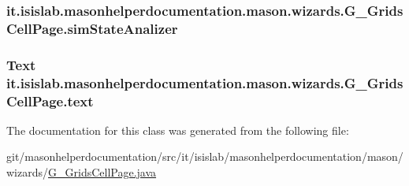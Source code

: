 \hypertarget{classit_1_1isislab_1_1masonhelperdocumentation_1_1mason_1_1wizards_1_1_g___grids_cell_page_aadd93c2041dd8e74fd87a3a432504fa2}{
\subsubsection[{sim\-State\-Analizer}]{ it.\-isislab.\-masonhelperdocumentation.\-mason.\-wizards.\-G\-\_\-\-Grids\-Cell\-Page.\-sim\-State\-Analizer\hspace{0.3cm}{\ttfamily [private]}}}\label{classit_1_1isislab_1_1masonhelperdocumentation_1_1mason_1_1wizards_1_1_g___grids_cell_page_aadd93c2041dd8e74fd87a3a432504fa2}
\hypertarget{classit_1_1isislab_1_1masonhelperdocumentation_1_1mason_1_1wizards_1_1_g___grids_cell_page_aaccd7bc0434484906b1e388bd6b5a1cc}{
\subsubsection[{text}]{\setlength{\rightskip}{0pt plus 5cm}Text it.\-isislab.\-masonhelperdocumentation.\-mason.\-wizards.\-G\-\_\-\-Grids\-Cell\-Page.\-text\hspace{0.3cm}{\ttfamily [private]}}}\label{classit_1_1isislab_1_1masonhelperdocumentation_1_1mason_1_1wizards_1_1_g___grids_cell_page_aaccd7bc0434484906b1e388bd6b5a1cc}


The documentation for this class was generated from the following file\-:\begin{DoxyCompactItemize}
\item 
git/masonhelperdocumentation/src/it/isislab/masonhelperdocumentation/mason/wizards/\hyperlink{_g___grids_cell_page_8java}{G\-\_\-\-Grids\-Cell\-Page.\-java}\end{DoxyCompactItemize}
